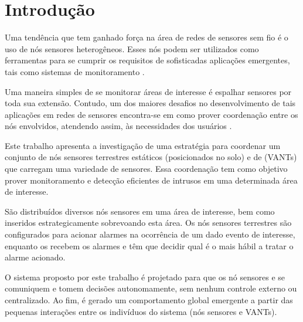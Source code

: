 \section{Introdução}
\label{chap:Introdução}

Uma tendência que tem ganhado força na área de redes de sensores sem fio é o uso
de nós sensores heterogêneos. Esses nós podem ser utilizados como ferramentas
para se cumprir os requisitos de sofisticadas aplicações emergentes, tais como
sistemas de monitoramento \cite{Freitas20092}.

Uma maneira simples de se monitorar áreas de interesse é espalhar sensores por
toda sua extensão. Contudo, um dos maiores desafios no desenvolvimento de tais
aplicações em redes de sensores encontra-se em como prover coordenação entre os
nós envolvidos, atendendo assim, às necessidades dos usuários
\cite{Mhatre2005}.

Este trabalho apresenta a investigação de uma estratégia para coordenar um
conjunto de nós sensores terrestres estáticos (posicionados no solo) e de \uavs
(VANTs) que carregam uma variedade de sensores.
Essa coordenação tem como objetivo prover monitoramento e detecção eficientes de
intrusos em uma determinada área de interesse. %


São distribuídos diversos nós sensores em uma área de interesse, bem como inseridos 
estrategicamente \vants sobrevoando esta área. Os nós
sensores terrestres são configurados para acionar alarmes na ocorrência de um
dado evento de interesse, enquanto os
\vants recebem os alarmes e têm que decidir qual \vant é o mais hábil a tratar o
alarme acionado.

O sistema proposto por este trabalho é projetado para que os nó sensores e
\vants se comuniquem e tomem decisões autonomamente, sem nenhum controle
externo ou centralizado. Ao fim, é gerado um comportamento global emergente a
partir das pequenas interações entre os indivíduos do sistema (nós sensores e
VANTs).


